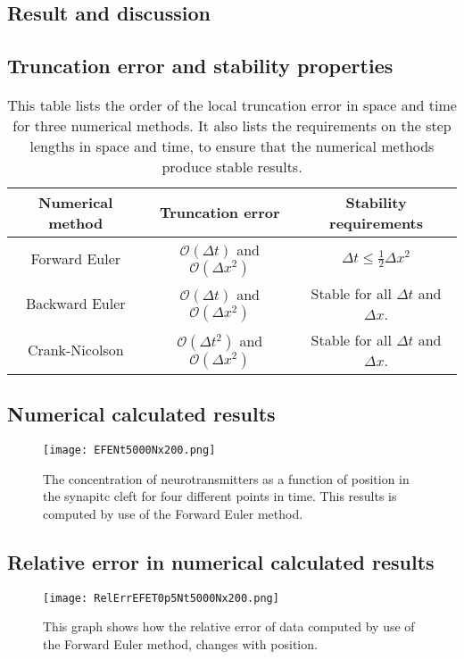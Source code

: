\documentclass[12pt]{article}
\begin{document}
\begin{flushleft}
\newpage
\section{Result and discussion}
\subsection{Truncation error and stability properties}

\begin{table}[!h]
\begin{center}
\begin{tabular}{| c | c | c |}
	\hline
	\textbf{Numerical method} & \textbf{Truncation error} & \textbf{Stability requirements}\\
	\hline	
	Forward Euler & $\mathcal{O}(\Delta t)$ and $\mathcal{O}(\Delta x^2)$ & $\Delta t \leq \frac{1}{2}\Delta x^2$ \\
		Backward Euler & $\mathcal{O}(\Delta t)$ and $\mathcal{O}(\Delta x^2)$ & Stable for all $\Delta t$ and $\Delta x$.\\
			Crank-Nicolson & $\mathcal{O}(\Delta t^2)$ and $\mathcal{O}(\Delta x^2)$ & Stable for all $\Delta t$ and $\Delta x$.\\
  \hline
\end{tabular}
\end{center}
\caption{\label{tab:error_stability}This table lists the order of the local truncation error in space and time for three numerical methods. It also lists the requirements on the step lengths in space and time, to ensure that the numerical methods produce stable results.}
\end{table}

\subsection{Numerical calculated results}

\begin{figure}[!h]
\begin{center}
\texttt{[image: EFENt5000Nx200.png]}
\caption{\label{fig:forward_Euler_u}The concentration of neurotransmitters as a function of position in the synapitc cleft for four different points in time. This results is computed by use of the Forward Euler method.}
\end{center}
\end{figure}



\subsection{Relative error in numerical calculated results}
\begin{figure}[!h]
\begin{center}
\texttt{[image: RelErrEFET0p5Nt5000Nx200.png]}
\caption{\label{fig:forward_Euler_error}This graph shows how the relative error of data computed by use of the Forward Euler method, changes with position.}
\end{center}
\end{figure}


\end{flushleft}
\end{document}
